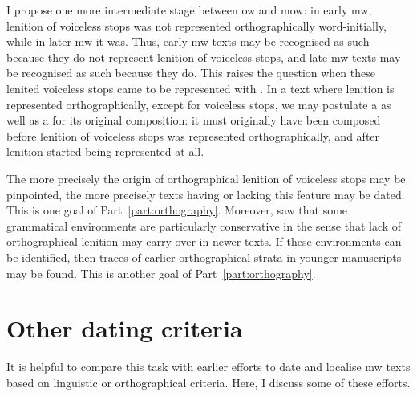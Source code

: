 I propose one more intermediate stage between \gls{ow} and \gls{mow}: in early \gls{mw}, lenition of voiceless stops was not represented orthographically word-initially, while in later \gls{mw} it was. Thus, early \gls{mw} texts may be recognised as such because they do not represent lenition of voiceless stops, and late \gls{mw} texts may be recognised as such because they do. This raises the question when these lenited voiceless stops came to be represented with . In a text where  lenition is represented orthographically, except for voiceless stops, we may postulate a  as well as a  for its original composition: it must originally have been composed before lenition of voiceless stops was represented orthographically, and after lenition started being represented at all.

The more precisely the origin of orthographical lenition of voiceless stops may be pinpointed, the more precisely texts having or lacking this feature may be dated. This is one goal of Part~\ref{part:orthography}. Moreover, \textcite{van_development14} saw that some grammatical environments are particularly conservative in the sense that lack of orthographical lenition may carry over in newer texts. If these environments can be identified, then traces of  earlier orthographical strata in younger manuscripts may be found. This is another goal of Part~\ref{part:orthography}.

\section{Other dating criteria}
\label{sec:other-dating-crit}

It is helpful to compare this task with earlier efforts to date and localise \gls{mw} texts based on linguistic or orthographical criteria. Here, I discuss some of these efforts.

